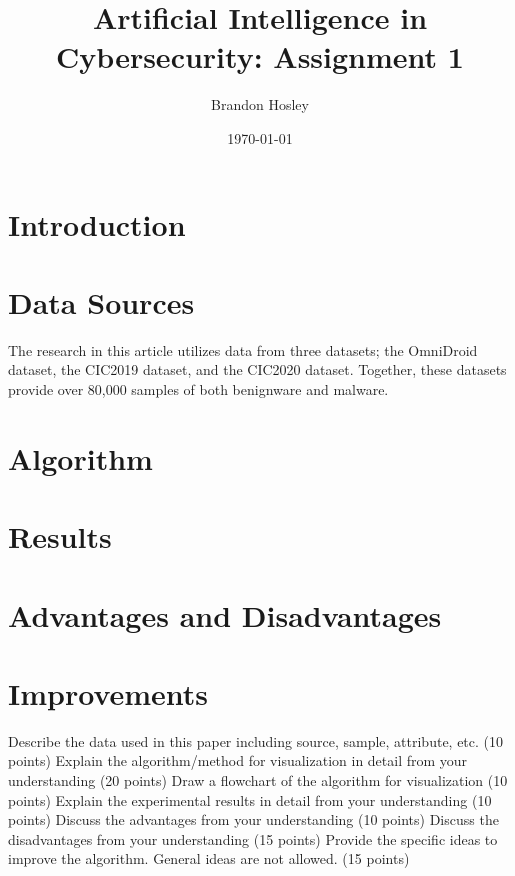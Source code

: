 \documentclass[]{article}
\title{Artificial Intelligence in Cybersecurity: Assignment 1}
\author{Brandon Hosley}
\date{\today}
\begin{document}
	\maketitle
	
\section{Introduction}

\section{Data Sources}

The research in this article utilizes data from three datasets; 
the OmniDroid \cite{Martin2019} dataset,  
the CIC2019 \cite{Taheri2019} dataset, and
the CIC2020 \cite{Rahali2020} dataset.
Together, these datasets provide over 80,000 samples of both benignware and malware.

\section{Algorithm}
\section{Results}
\section{Advantages and Disadvantages}
\section{Improvements}

Describe the data used in this paper including source, sample, attribute, etc. (10 points)
Explain the algorithm/method for visualization in detail from your understanding (20 points)
Draw a flowchart of the algorithm for visualization (10 points)
Explain the experimental results in detail from your understanding (10 points)
Discuss the advantages from your understanding (10 points)
Discuss the disadvantages from your understanding (15 points)
Provide the specific ideas to improve the algorithm. General ideas are not allowed. (15 points)

\clearpage


\end{document}
